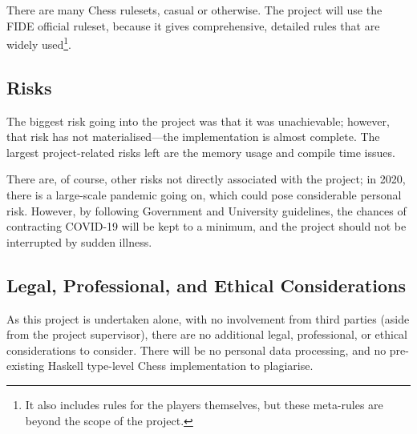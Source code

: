 \documentclass[12pt, a4paper]{scrartcl}
\begin{document}
There are many Chess rulesets, casual or otherwise. The project will use the FIDE official ruleset, because it gives comprehensive, detailed rules that are widely used\footnote{It also includes rules for the players themselves, but these meta-rules are beyond the scope of the project.}.

\subsection{Risks}

The biggest risk going into the project was that it was unachievable; however, that risk has not materialised---the implementation is almost complete. The largest project-related risks left are the memory usage and compile time issues. 

There are, of course, other risks not directly associated with the project; in 2020, there is a large-scale pandemic going on, which could pose considerable personal risk. However, by following Government and University guidelines, the chances of contracting COVID-19 will be kept to a minimum, and the project should not be interrupted by sudden illness.

\subsection{Legal, Professional, and Ethical Considerations}

As this project is undertaken alone, with no involvement from third parties (aside from the project supervisor), there are no additional legal, professional, or ethical considerations to consider. There will be no personal data processing, and no pre-existing Haskell type-level Chess implementation to plagiarise.




\end{document}
